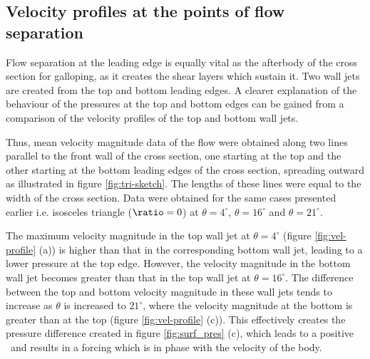 
\subsection{Velocity profiles at the points of flow separation}

Flow separation at the leading edge is equally vital as the afterbody of the cross section for galloping, as it creates the shear layers which sustain it. Two wall jets are created from the top and bottom leading edges. A clearer explanation of the behaviour of the pressures at the top and bottom edges can be gained from a comparison of the velocity profiles of the top and bottom wall jets.
 
 Thus, mean velocity magnitude data of the flow were obtained along two lines parallel to the front wall of the cross section, one starting at the top and the other starting at the bottom leading edges of the cross section, spreading outward as illustrated in figure \ref{fig:tri-sketch}. The lengths of these lines were equal to the width of the cross section. Data were obtained for the same cases presented earlier i.e. isosceles triangle ($\ratio=0$) at $\theta=4^{\circ}$, $\theta=16^{\circ}$ and $\theta=21^{\circ}$.  






The maximum velocity magnitude in the top wall jet at $\theta= 4^{\circ}$ (figure \ref{fig:vel-profile} (a)) is higher than that in the corresponding bottom wall jet, leading to a lower pressure at the top edge. However, the velocity magnitude in the bottom wall jet becomes greater than that in the top wall jet at $\theta=16^{\circ}$. The difference between the top and bottom velocity magnitude in these wall jets tends to increase as $\theta$ is increased to $21^{\circ}$, where the velocity magnitude at the bottom is greater than at the top (figure \ref{fig:vel-profile} (c)). This effectively creates the pressure difference created in figure \ref{fig:surf_pres} (c), which leads to a positive \cy\ and results in a forcing which is in phase with the velocity of the body. 

